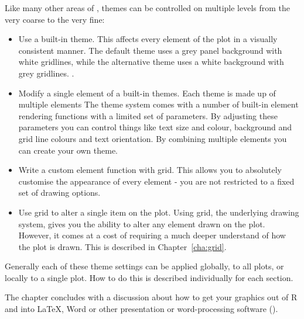 % 


Like many other areas of \ggplot, themes can be controlled on multiple levels from the very coarse to the very fine:

\begin{itemize}
  \item Use a built-in theme.  This affects every element of the plot in a visually consistent manner.  The default theme uses a grey panel background with white gridlines, while the alternative theme uses a white background with grey gridlines.  .

  \item Modify a single element of a built-in themes. Each theme is made up of multiple elements The theme system comes with a number of built-in element rendering functions with a limited set of parameters.  By adjusting these parameters you can control things like text size and colour, background and grid line colours and text orientation.  By combining multiple elements you can create your own theme.
  
  \item Write a custom element function with grid.  This allows you to absolutely customise the appearance of every element - you are not restricted to a fixed set of drawing options.  

  \item Use grid to alter a single item on the plot.  Using grid, the underlying drawing system, gives you the ability to alter any element drawn on the plot.  However, it comes at a cost of requiring a much deeper understand of how the plot is drawn.  This is described in Chapter~\ref{cha:grid}.
  
\end{itemize}

\noindent Generally each of these theme settings can be applied globally, to all plots, or locally to a single plot.  How to do this is described individually for each section.

The chapter concludes with a discussion about how to get your graphics out of R and into \LaTeX, Word or other presentation or word-processing software (\secref{}).

